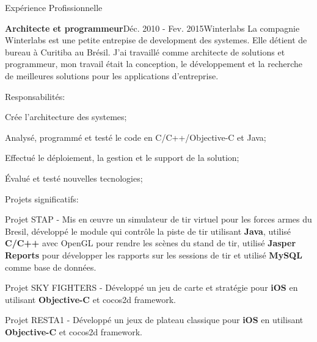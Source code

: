 \documentclass{resume}
\begin{document}
  \begin{rSection}{Expérience Profissionnelle}
    \begin{rSubsection}{\bf Architecte et programmeur}{Déc. 2010 - Fev. 2015}{Winterlabs}{}
    La compagnie Winterlabs est une petite entrepise de development des systemes. Elle
détient de bureau à Curitiba au Brésil. J'ai travaillé comme architecte de solutions et programmeur, mon travail était la conception, le développement et la recherche de meilleures solutions pour les applications d'entreprise.
    \end{rSubsection}
    \begin{rSubsection}{Responsabilités:}{}{}{}
      \item Crée l’architecture des systemes;
      \item Analysé, programmé et testé le code en C/C++/Objective-C et Java;
      \item Effectué le déploiement, la gestion et le support de la solution;
      \item Évalué et testé nouvelles tecnologies;
    \end{rSubsection}

    \begin{rSubsection}{Projets significatifs:}{}{}{}
      \item Projet STAP - Mis en œuvre un simulateur de tir virtuel pour les forces armes du Bresil, développé le module qui contrôle la piste de tir utilisant \textbf{Java}, utilisé \textbf{C/C++} avec OpenGL pour rendre les scènes du stand de tir, utilisé \textbf{Jasper Reports} pour développer les rapports sur les sessions de tir et utilisé \textbf{MySQL} comme base de données.
      \item Projet SKY FIGHTERS - Développé un jeu de carte et stratégie pour \textbf{iOS} en utilisant \textbf{Objective-C} et cocos2d framework.
      \item Projet RESTA1 - Développé un jeux de plateau classique pour \textbf{iOS} en utilisant \textbf{Objective-C} et cocos2d framework.
    \end{rSubsection}


\end{rSection}
\end{document}
